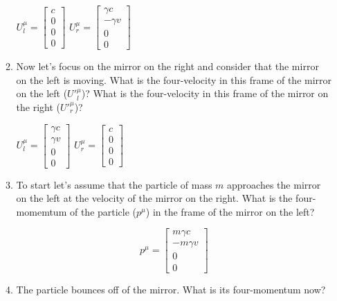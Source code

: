 \documentclass[pdftex,10pt]{article}
\begin{document}
\begin{enumerate}
\begin{enumerate}
\begin{center}
$
U_{l}^\mu = \left [ \begin{array}{c} c \\ 0 \\ 0 \\ 0 \end{array}
  \right ]
$
\hspace{1in}
$
U_{r}^\mu = \left [ \begin{array}{c} \gamma c \\ -\gamma v \\ 0 \\ 0 \end{array}
  \right ]
$
\end{center}

\item Now let's focus on the mirror on the right and consider that
the mirror on the left is moving.  What is the four-velocity in this
frame of the mirror on the left ($U'^\mu_l$)?  What is the
four-velocity in this frame of the mirror on the right ($U'^\mu_r$)?

\begin{center}
$
U_{l}^\mu = \left [ \begin{array}{c} \gamma c \\ \gamma v \\ 0 \\ 0 \end{array}  \right ]
$
\hspace{1in}
$
U_{r}^\mu = \left [ \begin{array}{c} c \\ 0 \\ 0 \\ 0 \end{array}
  \right ]
$
\end{center}

\item To start let's assume that the particle of mass $m$
  approaches the mirror on the left at the velocity of the mirror on
  the right.  What is the four-momemtum of the particle ($p^\mu$) in
  the frame of the mirror on the left?

$$
p^\mu = \left [ \begin{array}{c} m\gamma c \\ -m\gamma v \\ 0 \\ 0 \end{array}
  \right ]
$$

\item The particle bounces off of the mirror.  What is its
  four-momentum now?


\end{enumerate}
\end{enumerate}
\end{document}
